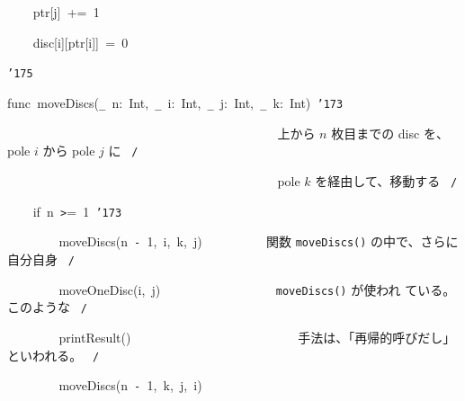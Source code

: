 \documentclass[a4paper,10pt]{article}
\def\mc{\relax}
\begin{document}
\noindent
\mbox{}{\tt\mc \ }{\tt\mc \ }{\tt\mc \ }{\tt\mc \ }ptr[j]{\tt\mc \ }+={\tt\mc \ }1

\noindent
\mbox{}{\tt\mc \ }{\tt\mc \ }{\tt\mc \ }{\tt\mc \ }disc[i][ptr[i]]{\tt\mc \ }={\tt\mc \ }0

\noindent
\mbox{}{\tt\char'175}

\noindent
\mbox{}\hfill

\noindent
\mbox{}func{\tt\mc \ }moveDiscs({\tt\_}{\tt\mc \ }n:{\tt\mc \ }Int,{\tt\mc \ }{\tt\_}{\tt\mc \ }i:{\tt\mc \ }Int,{\tt\mc \ }{\tt\_}{\tt\mc \ }j:{\tt\mc \ }Int,{\tt\mc \ }{\tt\_}{\tt\mc \ }k:{\tt\mc \ }Int){\tt\mc \ }{\tt\char'173}

\noindent
\mbox{}{\tt\mc \ \ \ \ \ \ \ \ }{\tt\mc \ \ \ \ \ \ \ \ }{\tt\mc \ \ \ \ \ \ \ \ }{\tt\mc \ \ \ \ \ \ \ \ }{\tt\mc \ \ \ \ \ \ \ \ }\rm\mc {\tt /}{\tt *}\  \ 上から $n$ 枚目までの disc
					   を、pole $i$ から pole $j$ に
					   \hfill \rm\mc \ {\tt *}{\tt /}
\tt\mc 

\noindent
\mbox{}{\tt\mc \ \ \ \ \ \ \ \ }{\tt\mc \ \ \ \ \ \ \ \ }{\tt\mc \ \ \ \ \ \ \ \ }{\tt\mc \ \ \ \ \ \ \ \ }{\tt\mc \ \ \ \ \ \ \ \ }\rm\mc {\tt /}{\tt *}\  \ pole $k$ を経由して、移動する
					   \hfill \rm\mc \ {\tt *}{\tt /}
\tt\mc 

\noindent
\mbox{}{\tt\mc \ }{\tt\mc \ }{\tt\mc \ }{\tt\mc \ }if{\tt\mc \ }n{\tt\mc \ }{\tt >}={\tt\mc \ }1{\tt\mc \ }{\tt\char'173}

\noindent
\mbox{}{\tt\mc \ }{\tt\mc \ }{\tt\mc \ }{\tt\mc \ }{\tt\mc \ }{\tt\mc \ }{\tt\mc \ }{\tt\mc \ }moveDiscs(n{\tt\mc \ }{\tt -}{\tt\mc \ }1,{\tt\mc \ }i,{\tt\mc \ }k,{\tt\mc \ }j){\tt\mc \ \ \ \ \ \ \ \ }\rm\mc {\tt /}{\tt *}\  \ 関数 {\tt moveDiscs()}
					   の中で、さらに自分自身 \hfill \rm\mc \ {\tt *}{\tt /}
\tt\mc 

\noindent
\mbox{}{\tt\mc \ }{\tt\mc \ }{\tt\mc \ }{\tt\mc \ }{\tt\mc \ }{\tt\mc \ }{\tt\mc \ }{\tt\mc \ }moveOneDisc(i,{\tt\mc \ }j){\tt\mc \ \ \ \ \ \ \ \ }{\tt\mc \ \ \ \ \ \ \ \ }\rm\mc {\tt /}{\tt *}\  \ {\tt moveDiscs()} が使われ
					   ている。このような \hfill \rm\mc \ {\tt *}{\tt /}
\tt\mc 

\noindent
\mbox{}{\tt\mc \ }{\tt\mc \ }{\tt\mc \ }{\tt\mc \ }{\tt\mc \ }{\tt\mc \ }{\tt\mc \ }{\tt\mc \ }printResult(){\tt\mc \ \ \ \ \ \ \ \ }{\tt\mc \ \ \ \ \ \ \ \ }{\tt\mc \ \ \ \ \ \ \ \ }\rm\mc {\tt /}{\tt *}\  \ 手法は、「再帰的呼びだし」
					   といわれる。 \hfill \rm\mc \ {\tt *}{\tt /}
\tt\mc 

\noindent
\mbox{}{\tt\mc \ }{\tt\mc \ }{\tt\mc \ }{\tt\mc \ }{\tt\mc \ }{\tt\mc \ }{\tt\mc \ }{\tt\mc \ }moveDiscs(n{\tt\mc \ }{\tt -}{\tt\mc \ }1,{\tt\mc \ }k,{\tt\mc \ }j,{\tt\mc \ }i)
\end{document}
